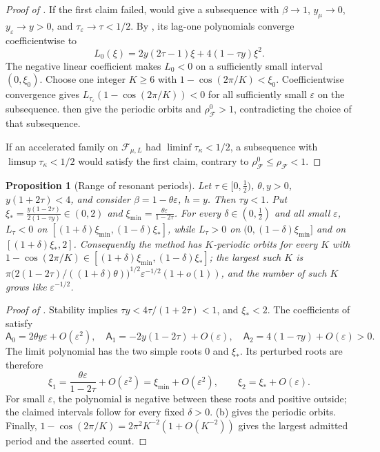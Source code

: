 \documentclass[11pt]{article}
\newtheorem{proposition}[theorem]{Proposition}
\theoremstyle{definition}
\theoremstyle{remark}
\newcommand{\cF}{\mathcal F}
\newcommand{\rhoF}{\rho_{\cF}}
\newcommand{\rhoz}{\rho_{\cF}^{0}}
\begin{document}
\begin{proof}[Proof of ]
If the first claim failed,  would give a subsequence
with \(\beta\to1\), \(y_\mu\to0\),
\(y_\varepsilon\to y>0\), and
\(\tau_\varepsilon\to\tau<1/2\).
By , its lag-one polynomials converge coefficientwise to
\[
L_0(\xi)=2y(2\tau-1)\xi+4(1-\tau y)\xi^2.
\]
The negative linear coefficient makes \(L_0<0\) on a sufficiently
small interval \((0,\xi_0)\).  Choose one integer \(K\ge6\) with
\(1-\cos(2\pi/K)<\xi_0\).  Coefficientwise convergence gives
\(L_{\tau_\varepsilon}(1-\cos(2\pi/K))<0\) for all sufficiently
small \(\varepsilon\) on the subsequence.  
then give the periodic orbits and \(\rhoz>1\), contradicting the
choice of that subsequence.

If an accelerated family on \(\cF_{\mu,L}\) had
\(\liminf\tau_\kappa<1/2\), a subsequence with
\(\limsup\tau_\kappa<1/2\) would satisfy the first claim, contrary
to \(\rhoz\le\rhoF<1\).
\end{proof}

\begin{proposition}[Range of resonant periods]\label{prop:periods}
Let \(\tau\in[0,\frac12)\), \(\theta,y>0\), \(y(1+2\tau)<4\), and consider
\(\beta=1-\theta\varepsilon\), \(h=y\).  Then \(\tau y<1\).  Put
\(\xi_*=\frac{y(1-2\tau)}{2(1-\tau y)}\in(0,2)\) and
\(\xi_{\min}=\frac{\theta\varepsilon}{1-2\tau}\).  For every
\(\delta\in(0,\frac12)\) and all small \(\varepsilon\),
\(L_\tau<0\) on \([(1+\delta)\xi_{\min},(1-\delta)\xi_*]\), while \(L_\tau>0\)
on \((0,(1-\delta)\xi_{\min}]\) and on \([(1+\delta)\xi_*,2]\).
Consequently the method has \(K\)-periodic orbits for every \(K\) with
\(1-\cos(2\pi/K)\in[(1+\delta)\xi_{\min},(1-\delta)\xi_*]\); the largest
such \(K\) is
\(\pi\bigl(2(1-2\tau)/((1+\delta)\theta)\bigr)^{1/2}\varepsilon^{-1/2}(1+o(1))\),
and the number of such \(K\) grows like \(\varepsilon^{-1/2}\).
\end{proposition}

\begin{proof}[Proof of ]
Stability implies \(\tau y<4\tau/(1+2\tau)<1\), and
\(\xi_*<2\).  The coefficients of  satisfy
\[
\mathsf A_0=2\theta y\varepsilon+O(\varepsilon^2),\quad
\mathsf A_1=-2y(1-2\tau)+O(\varepsilon),\quad
\mathsf A_2=4(1-\tau y)+O(\varepsilon)>0.
\]
The limit polynomial has the two simple roots \(0\) and \(\xi_*\).
Its perturbed roots are therefore
\[
\xi_1=\frac{\theta\varepsilon}{1-2\tau}+O(\varepsilon^2)
=\xi_{\min}+O(\varepsilon^2),\qquad
\xi_2=\xi_*+O(\varepsilon).
\]
For small \(\varepsilon\), the polynomial is negative between these
roots and positive outside; the claimed intervals follow for every
fixed \(\delta>0\).  (b) gives the periodic orbits.
Finally,
\(1-\cos(2\pi/K)=2\pi^2K^{-2}(1+O(K^{-2}))\)
gives the largest admitted period and the asserted count.
\end{proof}
\end{document}
